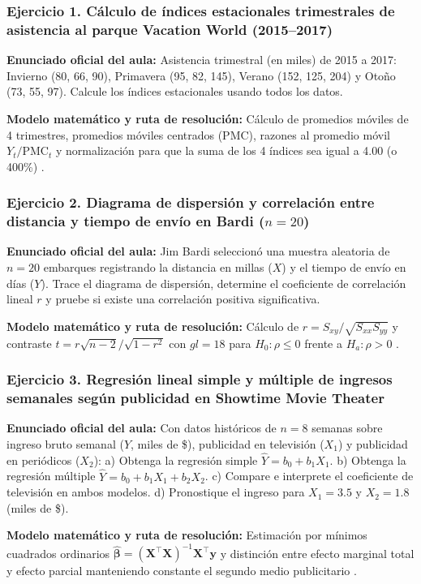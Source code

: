{\subsubsection*{Ejercicio 1. Cálculo de índices estacionales trimestrales de asistencia al parque Vacation World (2015--2017)}
\textbf{Enunciado oficial del aula:} Asistencia trimestral (en miles) de 2015 a 2017: Invierno (80, 66, 90), Primavera (95, 82, 145), Verano (152, 125, 204) y Otoño (73, 55, 97). Calcule los índices estacionales usando todos los datos.

\textbf{Modelo matemático y ruta de resolución:} Cálculo de promedios móviles de 4 trimestres, promedios móviles centrados (PMC), razones al promedio móvil $Y_t / \text{PMC}_t$ y normalización para que la suma de los 4 índices sea igual a 4.00 (o 400\%) \citep{anderson2012,lind2012}.

\subsubsection*{Ejercicio 2. Diagrama de dispersión y correlación entre distancia y tiempo de envío en Bardi ($n=20$)}
\textbf{Enunciado oficial del aula:} Jim Bardi seleccionó una muestra aleatoria de $n = 20$ embarques registrando la distancia en millas ($X$) y el tiempo de envío en días ($Y$). Trace el diagrama de dispersión, determine el coeficiente de correlación lineal $r$ y pruebe si existe una correlación positiva significativa.

\textbf{Modelo matemático y ruta de resolución:} Cálculo de $r = S_{xy}/\sqrt{S_{xx}S_{yy}}$ y contraste $t = r\sqrt{n-2}/\sqrt{1-r^2}$ con $gl = 18$ para $H_0: \rho \le 0$ frente a $H_a: \rho > 0$ \citep{lind2012}.

\subsubsection*{Ejercicio 3. Regresión lineal simple y múltiple de ingresos semanales según publicidad en Showtime Movie Theater}
\textbf{Enunciado oficial del aula:} Con datos históricos de $n = 8$ semanas sobre ingreso bruto semanal ($Y$, miles de \$), publicidad en televisión ($X_1$) y publicidad en periódicos ($X_2$): a) Obtenga la regresión simple $\hat{Y} = b_0 + b_1 X_1$. b) Obtenga la regresión múltiple $\hat{Y} = b_0 + b_1 X_1 + b_2 X_2$. c) Compare e interprete el coeficiente de televisión en ambos modelos. d) Pronostique el ingreso para $X_1 = 3.5$ y $X_2 = 1.8$ (miles de \$).

\textbf{Modelo matemático y ruta de resolución:} Estimación por mínimos cuadrados ordinarios $\hat{\boldsymbol{\beta}} = (\mathbf{X}^\top\mathbf{X})^{-1}\mathbf{X}^\top\mathbf{y}$ y distinción entre efecto marginal total y efecto parcial manteniendo constante el segundo medio publicitario \citep{anderson2012}.

}
